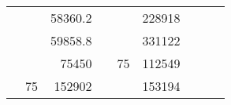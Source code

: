 \begin{table}[H]
\begin{tabular}{|ccrccrccc}
\multicolumn{1}{|c|}{\cellcolor[HTML]{FFFFC7}}                                & \multicolumn{1}{c|}{\cellcolor[HTML]{DAE8FC}}                      & \multicolumn{1}{r|}{\cellcolor[HTML]{DAE8FC}58360.2}   & \multicolumn{1}{c|}{\cellcolor[HTML]{FFFFC7}}                                & \multicolumn{1}{c|}{\cellcolor[HTML]{DAE8FC}}                       & \multicolumn{1}{r|}{\cellcolor[HTML]{DDFDFF}228918}    &                                                                              &                                                                    &                                                        \\ \cline{3-3} \cline{6-6}
\multicolumn{1}{|c|}{\cellcolor[HTML]{FFFFC7}}                                & \multicolumn{1}{c|}{\cellcolor[HTML]{DAE8FC}}                      & \multicolumn{1}{r|}{\cellcolor[HTML]{DDFDFF}59858.8}   & \multicolumn{1}{c|}{\cellcolor[HTML]{FFFFC7}}                                & \multicolumn{1}{c|}{\cellcolor[HTML]{DAE8FC}}                       & \multicolumn{1}{r|}{\cellcolor[HTML]{DAE8FC}331122}    &                                                                              &                                                                    &                                                        \\ \cline{3-3} \cline{6-6}
\multicolumn{1}{|c|}{\cellcolor[HTML]{FFFFC7}}                                & \multicolumn{1}{c|}{\cellcolor[HTML]{DAE8FC}}                      & \multicolumn{1}{r|}{\cellcolor[HTML]{DAE8FC}75450}     & \multicolumn{1}{c|}{\cellcolor[HTML]{FFFFC7}}                                & \multicolumn{1}{c|}{\multirow{-10}{*}{\cellcolor[HTML]{DAE8FC}75}}  & \multicolumn{1}{r|}{\cellcolor[HTML]{DDFDFF}112549}    &                                                                              &                                                                    &                                                        \\ \cline{3-3} \cline{5-6}
\multicolumn{1}{|c|}{\cellcolor[HTML]{FFFFC7}}                                & \multicolumn{1}{c|}{\multirow{-10}{*}{\cellcolor[HTML]{DAE8FC}75}} & \multicolumn{1}{r|}{\cellcolor[HTML]{DDFDFF}152902}    & \multicolumn{1}{c|}{\cellcolor[HTML]{FFFFC7}}                                & \multicolumn{1}{c|}{\cellcolor[HTML]{DDFDFF}}                       & \multicolumn{1}{r|}{\cellcolor[HTML]{DAE8FC}153194}    &                                                                              &                                                                    &                                                        \\ \cline{2-3} \cline{6-6}

\end{tabular}
\end{table}
